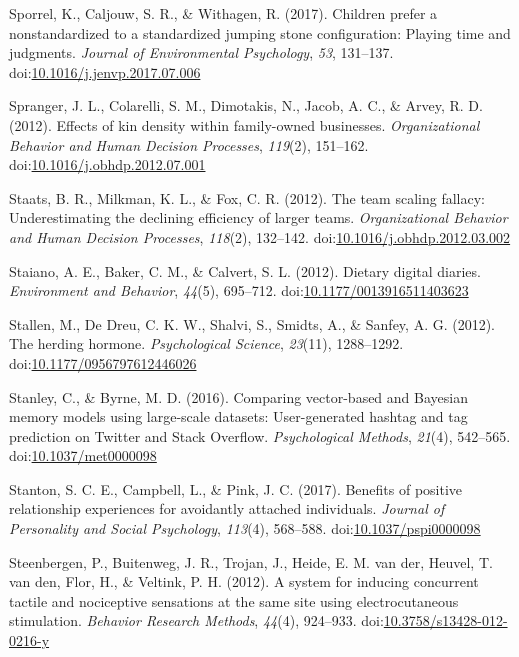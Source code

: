 \documentclass[english,man]{apa6}
\theoremstyle{definition}
\theoremstyle{definition}
\theoremstyle{definition}
\theoremstyle{remark}
\begin{document}
\hypertarget{ref-Sporrel2017}{}
Sporrel, K., Caljouw, S. R., \& Withagen, R. (2017). Children prefer a
nonstandardized to a standardized jumping stone configuration: Playing
time and judgments. \emph{Journal of Environmental Psychology},
\emph{53}, 131--137.
doi:\href{https://doi.org/10.1016/j.jenvp.2017.07.006}{10.1016/j.jenvp.2017.07.006}

\hypertarget{ref-Spranger2012}{}
Spranger, J. L., Colarelli, S. M., Dimotakis, N., Jacob, A. C., \&
Arvey, R. D. (2012). Effects of kin density within family-owned
businesses. \emph{Organizational Behavior and Human Decision Processes},
\emph{119}(2), 151--162.
doi:\href{https://doi.org/10.1016/j.obhdp.2012.07.001}{10.1016/j.obhdp.2012.07.001}

\hypertarget{ref-Staats2012}{}
Staats, B. R., Milkman, K. L., \& Fox, C. R. (2012). The team scaling
fallacy: Underestimating the declining efficiency of larger teams.
\emph{Organizational Behavior and Human Decision Processes},
\emph{118}(2), 132--142.
doi:\href{https://doi.org/10.1016/j.obhdp.2012.03.002}{10.1016/j.obhdp.2012.03.002}

\hypertarget{ref-Staiano2012}{}
Staiano, A. E., Baker, C. M., \& Calvert, S. L. (2012). Dietary digital
diaries. \emph{Environment and Behavior}, \emph{44}(5), 695--712.
doi:\href{https://doi.org/10.1177/0013916511403623}{10.1177/0013916511403623}

\hypertarget{ref-Stallen2012}{}
Stallen, M., De Dreu, C. K. W., Shalvi, S., Smidts, A., \& Sanfey, A. G.
(2012). The herding hormone. \emph{Psychological Science},
\emph{23}(11), 1288--1292.
doi:\href{https://doi.org/10.1177/0956797612446026}{10.1177/0956797612446026}

\hypertarget{ref-Stanley2016}{}
Stanley, C., \& Byrne, M. D. (2016). Comparing vector-based and Bayesian
memory models using large-scale datasets: User-generated hashtag and tag
prediction on Twitter and Stack Overflow. \emph{Psychological Methods},
\emph{21}(4), 542--565.
doi:\href{https://doi.org/10.1037/met0000098}{10.1037/met0000098}

\hypertarget{ref-Stanton2017}{}
Stanton, S. C. E., Campbell, L., \& Pink, J. C. (2017). Benefits of
positive relationship experiences for avoidantly attached individuals.
\emph{Journal of Personality and Social Psychology}, \emph{113}(4),
568--588.
doi:\href{https://doi.org/10.1037/pspi0000098}{10.1037/pspi0000098}

\hypertarget{ref-Steenbergen2012}{}
Steenbergen, P., Buitenweg, J. R., Trojan, J., Heide, E. M. van der,
Heuvel, T. van den, Flor, H., \& Veltink, P. H. (2012). A system for
inducing concurrent tactile and nociceptive sensations at the same site
using electrocutaneous stimulation. \emph{Behavior Research Methods},
\emph{44}(4), 924--933.
doi:\href{https://doi.org/10.3758/s13428-012-0216-y}{10.3758/s13428-012-0216-y}
\end{document}
